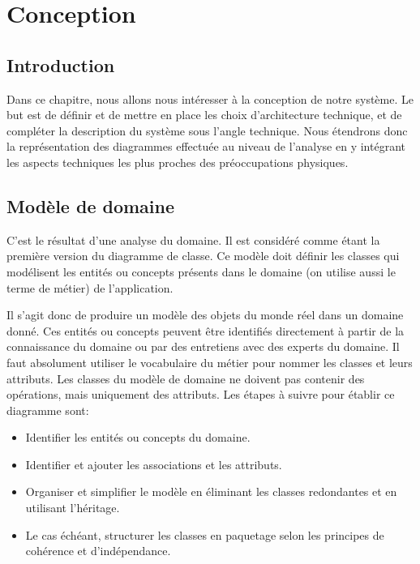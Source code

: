 \chapter{Conception}
\renewcommand{\headrulewidth}{1pt}

\section{Introduction}
Dans ce chapitre, nous allons nous intéresser à la conception de notre système.
Le but est de définir et de mettre en place les choix d’architecture technique, 
et de compléter la description du système sous l’angle technique. Nous 
étendrons donc la représentation des diagrammes effectuée au niveau de 
l’analyse en y intégrant les aspects techniques les plus proches des 
préoccupations physiques.

\section{Modèle de domaine}
C’est le résultat d’une analyse du domaine. Il est considéré comme étant la 
première version du diagramme de classe. Ce modèle doit définir les classes 
qui modélisent les entités ou concepts présents dans le domaine (on utilise 
aussi le terme de métier) de l’application.

Il s’agit donc de produire un modèle des objets du monde réel dans un domaine 
donné. Ces entités ou concepts peuvent être identifiés directement à partir de 
la connaissance du domaine ou par des entretiens avec des experts du domaine. 
Il faut absolument utiliser le vocabulaire du métier pour nommer les classes et 
leurs attributs. Les classes du modèle de domaine ne doivent pas contenir des 
opérations, mais uniquement des attributs\cite{7}. Les étapes à suivre pour 
établir ce diagramme sont:

\begin{itemize}
    \item [\textbullet] Identifier les entités ou concepts du domaine.
    \item [\textbullet] Identifier et ajouter les associations et les attributs.
    \item [\textbullet] Organiser et simplifier le modèle en éliminant les 
        classes redondantes et en utilisant l'héritage.
    \item [\textbullet] Le cas échéant, structurer les classes en paquetage 
        selon les principes de cohérence et d'indépendance.
\end{itemize}

